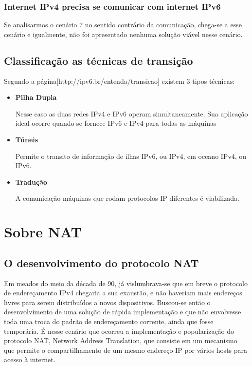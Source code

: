 \documentclass[
	12pt,				%
	oneside,			%
	a4paper,			%
	english,			%
	brazil,				%
	]{ime-abntex2}
\begin{document}
\subsection{Internet IPv4 precisa se comunicar com internet IPv6}
Se analisarmos o cenário 7 no sentido contrário da comunicação, chega-se a esse cenário e igualmente, não foi apresentado nenhuma solução viável nesse cenário.

\section{Classificação as técnicas de transição}
Segundo a página[http://ipv6.br/entenda/transicao] existem 3 tipos técnicas:

\begin{itemize}
  \item
    \textbf{Pilha Dupla}

    Nesse caso as duas redes IPv4 e IPv6 operam simultaneamente. Sua aplicação ideal ocorre quando se fornece IPv6 e IPv4 para todas as máquinas

  \item
    \textbf{Túneis}

    Permite o transito de informação de ilhas IPv6, ou IPv4, em oceano IPv4, ou IPv6.

  \item
    \textbf{Tradução}

    A comunicação máquinas que rodam protocolos IP diferentes é viabilizada.
\end{itemize}


\chapter{Sobre NAT}

\section{O desenvolvimento do protocolo NAT}

Em meados do meio da década de 90, já vislumbrava-se que em breve o protocolo de endereçamento IPv4
chegaria a sua exaustão, e não haveriam mais endereços livres para serem distribuídos a novos dispositivos.
Buscou-se então o desenvolvimento de uma solução de rápida implementação e que não envolvesse toda uma
troca do padrão de endereçamento corrente, ainda que fosse temporária. É nesse cenário que ocorreu a
implementação e popularização do protocolo NAT, Network Address Translation, que consiste em um mecanismo
que permite o compartilhamento de um mesmo endereço IP por vários hosts para acesso à internet.
\end{document}
